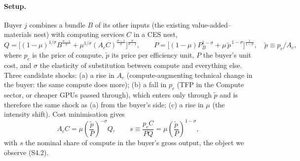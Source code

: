 \documentclass[11pt]{article}
\begin{document}
\paragraph{Setup.} Buyer $j$ combines a bundle $B$ of its other inputs (the existing value-added--materials nest) with computing services $C$ in a CES nest,
\[
Q = \Big[(1-\mu)^{1/\sigma} B^{\frac{\sigma-1}{\sigma}} + \mu^{1/\sigma} (A_c C)^{\frac{\sigma-1}{\sigma}}\Big]^{\frac{\sigma}{\sigma-1}},
\qquad
P = \Big[(1-\mu) P_B^{1-\sigma} + \mu\, \tilde p^{\,1-\sigma}\Big]^{\frac{1}{1-\sigma}},
\quad \tilde p \equiv p_c/A_c ,
\]
where $p_c$ is the price of compute, $\tilde p$ its price per efficiency unit, $P$ the buyer's unit cost, and $\sigma$ the elasticity of substitution between compute and everything else. Three candidate shocks: (a) a rise in $A_c$ (compute-augmenting technical change in the buyer: the same compute does more); (b) a fall in $p_c$ (TFP in the Compute sector, or cheaper GPUs passed through), which enters only through $\tilde p$ and is therefore the same shock as (a) from the buyer's side; (c) a rise in $\mu$ (the intensity shift). Cost minimisation gives
\[
A_c C = \mu \left(\frac{\tilde p}{P}\right)^{-\sigma} Q ,
\qquad
s \equiv \frac{p_c C}{P Q} = \mu \left(\frac{\tilde p}{P}\right)^{1-\sigma},
\]
with $s$ the nominal share of compute in the buyer's gross output, the object we observe (S4.2).
\end{document}
